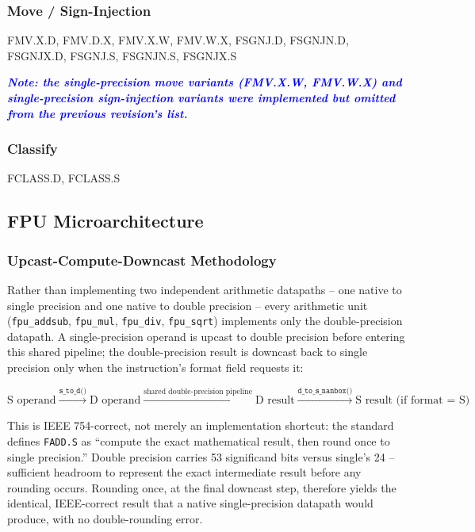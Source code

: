 \subsubsection{Move / Sign-Injection}
FMV.X.D, FMV.D.X, FMV.X.W, FMV.W.X, FSGNJ.D, FSGNJN.D, FSGNJX.D, FSGNJ.S,
FSGNJN.S, FSGNJX.S

\textcolor{blue}{\textbf{\textit{Note: the single-precision move variants
(FMV.X.W, FMV.W.X) and single-precision sign-injection variants were
implemented but omitted from the previous revision's list.}}}

\subsubsection{Classify}
FCLASS.D, FCLASS.S

\subsection{FPU Microarchitecture}

\subsubsection{Upcast-Compute-Downcast Methodology}
Rather than implementing two independent arithmetic datapaths -- one native
to single precision and one native to double precision -- every arithmetic
unit (\texttt{fpu\_addsub}, \texttt{fpu\_mul}, \texttt{fpu\_div},
\texttt{fpu\_sqrt}) implements only the double-precision datapath. A
single-precision operand is upcast to double precision before entering this
shared pipeline; the double-precision result is downcast back to single
precision only when the instruction's format field requests it:

\[
    \text{S operand}
    \xrightarrow{\texttt{s\_to\_d()}}
    \text{D operand}
    \xrightarrow{\text{shared double-precision pipeline}}
    \text{D result}
    \xrightarrow{\texttt{d\_to\_s\_nanbox()}}
    \text{S result (if format = S)}
\]

This is IEEE 754-correct, not merely an implementation shortcut: the
standard defines \texttt{FADD.S} as ``compute the exact mathematical result,
then round once to single precision.'' Double precision carries 53
significand bits versus single's 24 -- sufficient headroom to represent the
exact intermediate result before any rounding occurs. Rounding once, at the
final downcast step, therefore yields the identical, IEEE-correct result
that a native single-precision datapath would produce, with no
double-rounding error.

